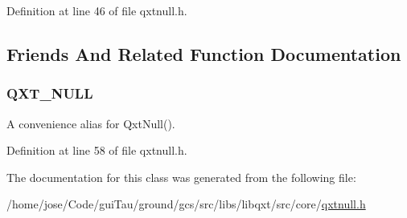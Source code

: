 Definition at line 46 of file qxtnull.\-h.



\subsection{Friends And Related Function Documentation}
\hypertarget{struct_qxt_null_aa80fa78e12057b65d076663dfa857dce}{
\subsubsection[{Q\-X\-T\-\_\-\-N\-U\-L\-L}]{\setlength{\rightskip}{0pt plus 5cm}Q\-X\-T\-\_\-\-N\-U\-L\-L\hspace{0.3cm}{\ttfamily [related]}}}\label{struct_qxt_null_aa80fa78e12057b65d076663dfa857dce}
A convenience alias for Qxt\-Null(). 

Definition at line 58 of file qxtnull.\-h.



The documentation for this class was generated from the following file\-:\begin{DoxyCompactItemize}
\item 
/home/jose/\-Code/gui\-Tau/ground/gcs/src/libs/libqxt/src/core/\hyperlink{qxtnull_8h}{qxtnull.\-h}\end{DoxyCompactItemize}
